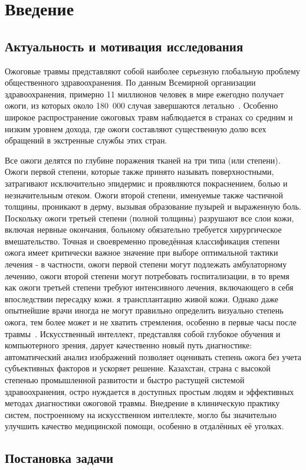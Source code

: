 \chapter{Введение}
\label{chap:intro}
\setlength{\parskip}{0.8em}
\section{Актуальность и мотивация исследования}
Ожоговые травмы представляют собой наиболее серьезную глобальную проблему общественного здравоохранения. По данным Всемирной организации здравоохранения, примерно 11 миллионов человек в мире ежегодно получает ожоги, из которых около 180~000 случая завершаются летально~\cite{who2018burns}. Особенно широкое распространение ожоговых травм наблюдается в странах со средним и низким уровнем дохода, где ожоги составляют существенную долю всех обращений в экстренные службы этих стран.

Все ожоги делятся по глубине поражения тканей на три типа (или степени). Ожоги первой степени, которые также принято называть поверхностными, затрагивают исключительно эпидермис и проявляются покраснением, болью и незначительным отеком. Ожоги второй степени, именуемые также частичной толщины, проникают в дерму, вызывая образование пузырей и выраженную боль. Поскольку ожоги третьей степени (полной толщины) разрушают все слои кожи, включая нервные окончания, больному обязательно требуется хирургическое вмешательство. Точная и своевременно проведённая классификация степени ожога имеет критически важное значение при выборе оптимальной тактики лечения - в частности, ожоги первой степени могут подлежать амбулаторному лечению, ожоги второй степени могут потребовать госпитализации, в то время как ожоги третьей степени требуют интенсивного лечения, включающего в себя впоследствии пересадку кожи. я трансплантацию живой кожи. Однако даже опытнейшие врачи иногда не могут правильно определить визуально степень ожога, тем более может и не хватить стремления, особенно в первые часы после травмы~\cite{monstrey2008assessment}. Искусственный интеллект, представляя собой глубокое обучения и компьютерного зрения, дарует качественно новый путь диагностике: автоматический анализ изображений позволяет оценивать степень ожога без учета субъективных факторов и ускоряет решение. Казахстан, страна с высокой степенью промышленной развитости и быстро растущей системой здравоохранения, остро нуждается в доступных простым людям и эффективных методах диагностики ожоговой травмы. Внедрение в клиническую практику систем, построенному на искусственном интеллекте, могло бы значительно улучшить качество медицинской помощи, особенно в отдалённых её уголках. \section{Постановка задачи}

